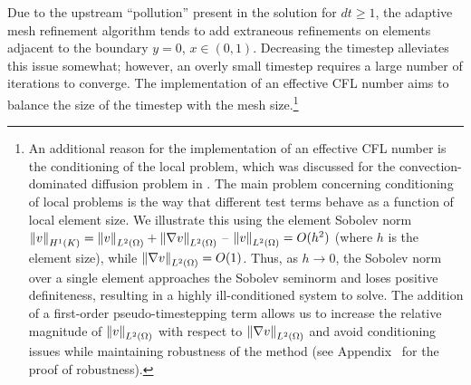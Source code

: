 Due to the upstream ``pollution'' present in the solution for $dt \geq 1$, the adaptive mesh refinement algorithm tends to add extraneous refinements on elements adjacent to the boundary $y = 0$, $x\in (0,1)$.  Decreasing the timestep alleviates this issue somewhat; however, an overly small timestep requires a large number of iterations to converge.  The implementation of an effective CFL number aims to balance the size of the timestep with the mesh size.\footnote{An additional reason for the implementation of an effective CFL number is the conditioning of the local problem, which was discussed for the convection-dominated diffusion problem in \cite{DPG3}.  The main problem concerning conditioning of local problems is the way that different test terms behave as a function of local element size.  We illustrate this using the element Sobolev norm $\nor{v}_{H^1(K)} = \nor{v}_{\L} + \nor{\grad v}_{\L}$ -- $\nor{v}_{\L} = O(h^2)$ (where $h$ is the element size), while $\nor{\grad v}_{\L} = O(1)$.  Thus, as $h\rightarrow 0$, the Sobolev norm over a single element approaches the Sobolev seminorm and loses positive definiteness, resulting in a highly ill-conditioned system to solve.  The addition of a first-order pseudo-timestepping term allows us to increase the relative magnitude of $\nor{v}_{\L}$ with respect to $\nor{\grad v}_{\L}$ and avoid conditioning issues while maintaining robustness of the method (see Appendix~ for the proof of robustness).}  

